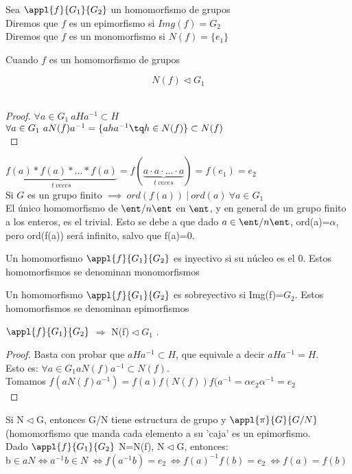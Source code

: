 \documentclass[a4paper,10pt]{apuntes}
\begin{document}
\begin{defn}
Sea $\appl{f}{G_1}{G_2}$ un homomorfismo de grupos\\
Diremos que $f$ es un epimorfismo si $Img(f) = G_2$\\
Diremos que $f$ es un monomorfismo si $N(f) = \{ e_1\} $
\end{defn}

\begin{lemma} Cuando $f$ es un homomorfismo de grupos

$$N(f) \lhd G_1$$\\
\end{lemma}

\begin{proof}
$\forall a\in G_1\ aHa^{-1}\subset H$\\
$\forall a\in G_1\ aN(f)a^{-1} = \{aha^{-1} \tq h\in N(f) \}\subset N(f)$\\
\end{proof}


$\underbrace{f(a) \ast f(a) \ast \hdots \ast f(a)}_{t\ veces} = f(\underbrace{a \cdot a \cdot \hdots \cdot a}_{t\ veces}) = f(e_1) = e_2$\\ 
Si $G$ es un grupo finito $\implies\ ord(f(a))\ |\ ord(a)\ \forall a \in G_1$\\

El único homomorfismo de $\ent/n\ent$  en $\ent$, y en general de un grupo finito a los enteros, es el trivial. Esto se debe
a que dado $a\in\ent/n\ent$, ord(a)=$\alpha$, pero ord(f(a)) será infinito, salvo que f(a)=0.

\begin{defn}
 Un homomorfismo $\appl{f}{G_1}{G_2}$  es inyectivo si su núcleo es el 0. Estos homomorfismos se denominan monomorfismos
\end{defn}
\begin{defn}
 Un homomorfismo $\appl{f}{G_1}{G_2}$  es sobreyectivo si Img(f)=$G_2$. Estos homomorfismos se denominan epimorfismos
\end{defn}
 
 \begin{lemma}
  $\appl{f}{G_1}{G_2}$  $\Rightarrow$  N(f)$\vartriangleleft G_1$ .
 \end{lemma}
  \begin{proof}
   Basta con probar que $aHa^{-1}\subset H$, que equivale a decir $aHa^{-1}=H$.\\
   Esto es: $\forall a \in G_{1} aN(f)a^{-1}\subset N(f)$.\\
   Tomamos $f(aN(f)a^{-1})=f(a)f(N(f))f(a^{-1}=\alpha e_{2} \alpha^{-1}=e_{2}$\\
  \end{proof}
  
Si N$\vartriangleleft$G, entonces G/N tiene estructura de grupo y $\appl{\pi}{G}{G/N}$  (homomorfismo que manda cada
elemento a su 'caja'  es un epimorfismo.\\

Dado $\appl{f}{G_1}{G_2}$  N=N(f), N$\vartriangleleft$G, entonces:\\
b$\in aN \Leftrightarrow a^{-1}b\in N \ \Leftrightarrow f(a^{-1}b)=e_2 \ \Leftrightarrow f(a)^{-1}f(b)=e_2 \ \Leftrightarrow f(a)=f(b)$
\end{document}
